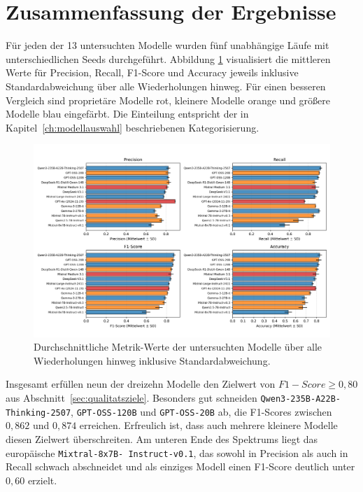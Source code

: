 \section{Zusammenfassung der Ergebnisse}\label{sec:ueberblick}

Für jeden der 13 untersuchten Modelle wurden fünf unabhängige Läufe mit unterschiedlichen Seeds durchgeführt. Abbildung \ref{fig:results-evaluation-metrics-comparison} visualisiert die mittleren Werte für Precision, Recall, F1-Score und Accuracy jeweils inklusive Standardabweichung über alle Wiederholungen hinweg. Für einen besseren Vergleich sind proprietäre Modelle rot, kleinere Modelle orange und größere Modelle blau eingefärbt. Die Einteilung entspricht der in Kapitel~\ref{ch:modellauswahl} beschriebenen Kategorisierung.

\begin{figure}[htbp]
    \centering
    \includegraphics[width=\textwidth,trim=20 40 20 10]{images/results/evaluation_metrics_comparison}
    \caption{Durchschnittliche Metrik-Werte der untersuchten Modelle über alle Wiederholungen hinweg inklusive Standardabweichung.}
    \label{fig:results-evaluation-metrics-comparison}
\end{figure}

Insgesamt erfüllen neun der dreizehn Modelle den Zielwert von $F1-Score \geq 0{,}80$ aus Abschnitt~\ref{sec:qualitatsziele}. Besonders gut schneiden \texttt{Qwen3-235B-A22B-Thinking-2507}, \texttt{GPT-OSS-120B} und \texttt{GPT-OSS-20B} ab, die F1-Scores zwischen $0{,}862$ und $0{,}874$ erreichen. Erfreulich ist, dass auch mehrere kleinere Modelle diesen Zielwert überschreiten. Am unteren Ende des Spektrums liegt das europäische \texttt{Mixtral-8x7B-\linebreak~Instruct-v0.1}, das sowohl in Precision als auch in Recall schwach abschneidet und als einziges Modell einen F1-Score deutlich unter $0{,}60$ erzielt.

